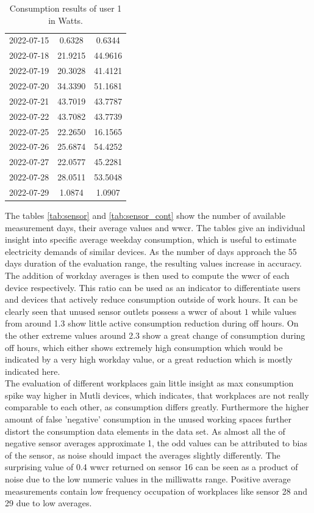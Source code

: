\begin{table}
\begin{tabular}{|l|c|c|}
		\\ 2022-07-15   &0.6328&     0.6344
		\\ 2022-07-18  &21.9215&    44.9616
		\\ 2022-07-19  &20.3028&    41.4121
		\\ 2022-07-20  &34.3390&    51.1681
		\\ 2022-07-21  &43.7019&    43.7787
		\\ 2022-07-22  &43.7082&    43.7739
		\\ 2022-07-25  &22.2650&    16.1565
		\\ 2022-07-26  &25.6874&    54.4252
		\\ 2022-07-27  &22.0577&    45.2281
		\\ 2022-07-28  &28.0511&    53.5048
		\\ 2022-07-29   &1.0874&     1.0907
	\end{tabular}
	\caption{Consumption results of user 1 in Watts.}
	\label{tab:user1}
\end{table}
The tables \ref{tab:sensor} and \ref{tab:sensor_cont} show the number of available measurement days, their average values and \acrfull{wwcr}. The tables give an individual insight into specific average weekday consumption, which is useful to estimate electricity demands of similar devices. As the number of days approach the 55 days duration of the evaluation range, the resulting values increase in accuracy. The addition of workday averages is then used to compute the \acrshort{wwcr} of each device respectively. This ratio can be used as an indicator to differentiate users and devices that actively reduce consumption outside of work hours. It can be clearly seen that unused sensor outlets possess a \acrshort{wwcr} of about $1$ while values from around 1.3 show little active consumption reduction during off hours. On the other extreme values around 2.3 show a great change of consumption during off hours, which either shows extremely high consumption which would be indicated by a very high \gls{workday} value, or a great reduction which is mostly indicated here.\\
The evaluation of different workplaces gain little insight as max consumption spike way higher in Mutli devices, which indicates, that workplaces are not really comparable to each other, as consumption differs greatly. Furthermore the higher amount of false 'negative' consumption in the unused working spaces further distort the consumption data elements in the data set. As almost all the  of negative sensor averages approximate 1, the odd values can be attributed to bias of the sensor, as noise should impact the averages slightly differently. The surprising value of 0.4 \acrshort{wwcr} returned on sensor 16 can be seen as a product of noise due to the low numeric values in the milliwatts range. Positive average measurements contain low frequency occupation of workplaces like sensor 28 and 29 due to low averages.\\
